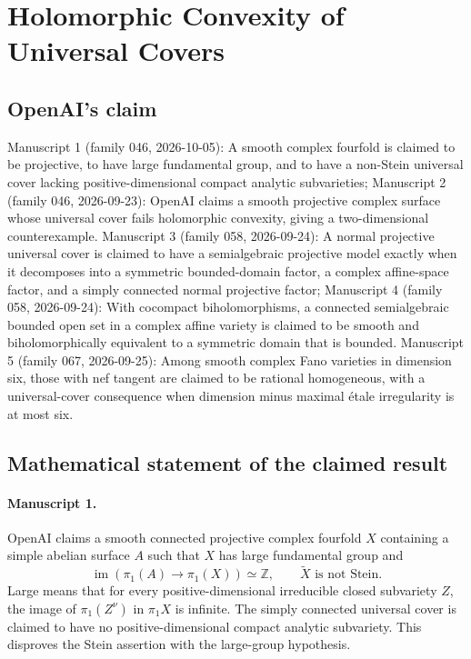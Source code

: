 \documentclass[11pt]{article}
\begin{document}
\section*{Holomorphic Convexity of Universal Covers}

\subsection{OpenAI's claim}
Manuscript 1 (family 046, 2026-10-05): A smooth complex fourfold is claimed to be projective, to have large fundamental group, and to have a non-Stein universal cover lacking positive-dimensional compact analytic subvarieties; Manuscript 2 (family 046, 2026-09-23): OpenAI claims a smooth projective complex surface whose universal cover fails holomorphic convexity, giving a two-dimensional counterexample. Manuscript 3 (family 058, 2026-09-24): A normal projective universal cover is claimed to have a semialgebraic projective model exactly when it decomposes into a symmetric bounded-domain factor, a complex affine-space factor, and a simply connected normal projective factor; Manuscript 4 (family 058, 2026-09-24): With cocompact biholomorphisms, a connected semialgebraic bounded open set in a complex affine variety is claimed to be smooth and biholomorphically equivalent to a symmetric domain that is bounded. Manuscript 5 (family 067, 2026-09-25): Among smooth complex Fano varieties in dimension six, those with nef tangent are claimed to be rational homogeneous, with a universal-cover consequence when dimension minus maximal étale irregularity is at most six.

\subsection{Mathematical statement of the claimed result}
\paragraph{Manuscript 1.}
OpenAI claims a smooth connected projective complex fourfold $X$ containing a simple abelian surface $A$ such that $X$ has large fundamental group and
\[
\operatorname{im}(\pi_1(A)\to\pi_1(X))\simeq\mathbb Z,
\qquad\widetilde X\text{ is not Stein}.
\]
Large means that for every positive-dimensional irreducible closed subvariety $Z$, the image of $\pi_1(Z^\nu)$ in $\pi_1X$ is infinite. The simply connected universal cover is claimed to have no positive-dimensional compact analytic subvariety. This disproves the Stein assertion with the large-group hypothesis.
\end{document}

